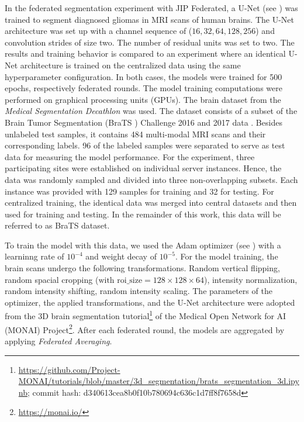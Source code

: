 
In the federated segmentation experiment with JIP Federated, a U-Net (see \cite{Ronneberger2015U-net:Segmentation}) was trained to segment diagnosed gliomas in MRI scans of human brains. The U-Net architecture was set up with a channel sequence of ($16, 32, 64, 128, 256$) and convolution strides of size two. The number of residual units was set to two.
The results and training behavior is compared to an experiment where an identical U-Net architecture is trained on the centralized data using the same hyperparameter configuration.
In both cases, the models were trained for 500 epochs, respectively federated rounds.
The model training computations were performed on graphical processing units (GPUs).
The brain dataset from the \textit{Medical Segmentation Decathlon} was used. The dataset consists of a subset of the Brain Tumor Segmentation (BraTS \cite{Menze2015TheBRATS}) Challenge 2016 and 2017 data \citep{Antonelli2021TheDecathlon}. Besides unlabeled test samples, it contains 484 multi-modal MRI scans and their corresponding labels. 96 of the labeled samples were separated to serve as test data for measuring the model performance. For the experiment, three participating sites were established on individual server instances. Hence, the data was randomly sampled and divided into three non-overlapping subsets. Each instance was provided with 129 samples for training and 32 for testing. For centralized training, the identical data was merged into central datasets and then used for training and testing.
In the remainder of this work, this data will be referred to as BraTS dataset.

To train the model with this data, we used the Adam optimizer (see \cite{Kingma2014Adam:Optimization}) with a 
learninng rate of $10^{-4}$
and weight decay of $10^{-5}$.
For the model training, the brain scans undergo the following transformations.
Random vertical flipping,
random spacial cropping ($\textrm{with roi\_size} =  128 \times 128 \times 64$),
intensity normalization,
random intensity shifting,
random intensity scaling.
The parameters of the optimizer, the applied transformations, and the U-Net architecture were adopted from the 3D brain segmentation tutorial\footnote{\url{https://github.com/Project-MONAI/tutorials/blob/master/3d\_segmentation/brats\_segmentation\_3d.ipynb}; commit hash: d340613cea8b0f10b780694c636c1d7ff8f7658d}
of the Medical Open Network for AI (MONAI) Project\footnote{\url{https://monai.io/}}. After each federated round, the models are aggregated by applying \textit{Federated Averaging}.

